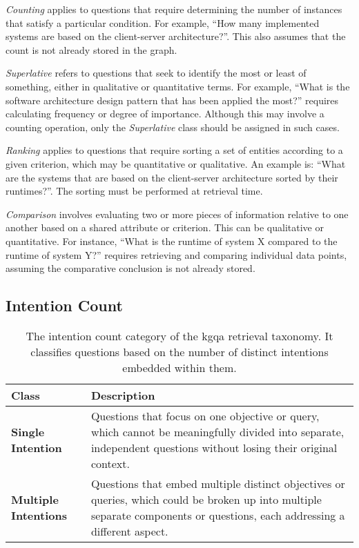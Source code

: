 \emph{Counting} applies to questions that require determining the number of instances that satisfy a particular condition. For example, \enquote{How many implemented systems are based on the client-server architecture?}. This also assumes that the count is not already stored in the graph.

\emph{Superlative} refers to questions that seek to identify the most or least of something, either in qualitative or quantitative terms. For example, \enquote{What is the software architecture design pattern that has been applied the most?} requires calculating frequency or degree of importance. Although this may involve a counting operation, only the \emph{Superlative} class should be assigned in such cases.

\emph{Ranking} applies to questions that require sorting a set of entities according to a given criterion, which may be quantitative or qualitative. An example is: \enquote{What are the systems that are based on the client-server architecture sorted by their runtimes?}. The sorting must be performed at retrieval time.

\emph{Comparison} involves evaluating two or more pieces of information relative to one another based on a shared attribute or criterion. This can be qualitative or quantitative. For instance, \enquote{What is the runtime of system X compared to the runtime of system Y?} requires retrieving and comparing individual data points, assuming the comparative conclusion is not already stored.

\subsection{Intention Count}

\begin{table}[t]
    \centering
    \begin{tabular}{@{}lp{8cm}@{}}
        \toprule
        \textbf{Class} & \textbf{Description} \\
        \midrule
            \textbf{Single Intention}
            & Questions that focus on one objective or query, which cannot be meaningfully divided into separate, independent questions without losing their original context. \\
        \cmidrule(l){1-2}
            \textbf{Multiple Intentions}
            & Questions that embed multiple distinct objectives or queries, which could be broken up into multiple separate components or questions, each addressing a different aspect. \\
        \bottomrule
    \end{tabular}
    \caption[Intention Count Category of the Taxonomy]{The intention count category of the \gls{kgqa} retrieval taxonomy. It classifies questions based on the number of distinct intentions embedded within them.}
    \label{tab:intention_count}
\end{table}

